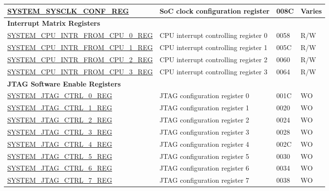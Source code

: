 \begin{longtable}{ | p{6.5cm} | p{7.5cm} | p{1.3cm} | p{1cm} | }
\hyperref[regdesc:SYSTEMSYSCLKCONFREG]{SYSTEM\_SYSCLK\_CONF\_REG} & SoC clock configuration register & \hexprefix{}008C & Varies \\ \hline

\multicolumn{4}{|l|}{\textbf{Interrupt Matrix Registers}} \\ \hline
\hyperref[regdesc:SYSTEMCPUINTRFROMCPU0REG]{SYSTEM\_CPU\_INTR\_FROM\_CPU\_0\_REG} & CPU interrupt controlling register 0 & \hexprefix{}0058 & R/W \\ \hline
\hyperref[regdesc:SYSTEMCPUINTRFROMCPU1REG]{SYSTEM\_CPU\_INTR\_FROM\_CPU\_1\_REG} & CPU interrupt controlling register 1 & \hexprefix{}005C & R/W \\ \hline
\hyperref[regdesc:SYSTEMCPUINTRFROMCPU2REG]{SYSTEM\_CPU\_INTR\_FROM\_CPU\_2\_REG} & CPU interrupt controlling register 2 & \hexprefix{}0060 & R/W \\ \hline
\hyperref[regdesc:SYSTEMCPUINTRFROMCPU3REG]{SYSTEM\_CPU\_INTR\_FROM\_CPU\_3\_REG} & CPU interrupt controlling register 3 & \hexprefix{}0064 & R/W \\ \hline


\multicolumn{4}{|l|}{\textbf{JTAG Software Enable Registers}} \\ \hline
\hyperref[regdesc:SYSTEMJTAGCTRL0REG]{SYSTEM\_JTAG\_CTRL\_0\_REG} & JTAG configuration register 0 & \hexprefix{}001C & WO \\ \hline
\hyperref[regdesc:SYSTEMJTAGCTRL1REG]{SYSTEM\_JTAG\_CTRL\_1\_REG} & JTAG configuration register 1 & \hexprefix{}0020 & WO \\ \hline
\hyperref[regdesc:SYSTEMJTAGCTRL2REG]{SYSTEM\_JTAG\_CTRL\_2\_REG} & JTAG configuration register 2 & \hexprefix{}0024 & WO \\ \hline
\hyperref[regdesc:SYSTEMJTAGCTRL3REG]{SYSTEM\_JTAG\_CTRL\_3\_REG} & JTAG configuration register 3 & \hexprefix{}0028 & WO \\ \hline
\hyperref[regdesc:SYSTEMJTAGCTRL4REG]{SYSTEM\_JTAG\_CTRL\_4\_REG} & JTAG configuration register 4 & \hexprefix{}002C & WO \\ \hline
\hyperref[regdesc:SYSTEMJTAGCTRL5REG]{SYSTEM\_JTAG\_CTRL\_5\_REG} & JTAG configuration register 5 & \hexprefix{}0030 & WO \\ \hline
\hyperref[regdesc:SYSTEMJTAGCTRL6REG]{SYSTEM\_JTAG\_CTRL\_6\_REG} & JTAG configuration register 6 & \hexprefix{}0034 & WO \\ \hline
\hyperref[regdesc:SYSTEMJTAGCTRL7REG]{SYSTEM\_JTAG\_CTRL\_7\_REG} & JTAG configuration register 7 & \hexprefix{}0038 & WO \\ \hline


\end{longtable}
